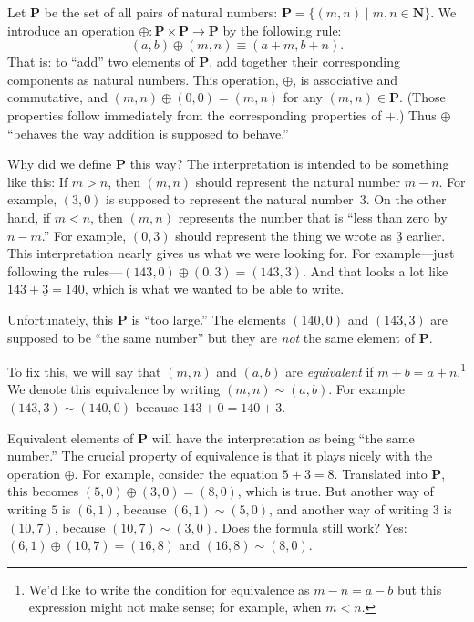 \documentclass[10pt, a4paper, twocolumn]{article}
\newcommand{\set}[1]{\mathbold{#1}}
\newcommand{\N}{\set{N}}
\newcommand{\pairs}{\set{P}}
\newcommand{\minus}[1]{\underline{#1}}
\begin{document}
Let $\pairs$ be the set of all pairs of natural numbers: $\pairs =
\{(m, n) \mid m,n\in \N\}$. We introduce an operation
$\oplus:\pairs\times\pairs\to\pairs$ by the following rule:
\begin{equation}\label{pairs:addition}
  (a, b) \oplus (m, n) \equiv (a + m, b + n).
\end{equation}
That is: to ``add'' two elements of $\pairs$, add together their
corresponding components as natural numbers. This operation, $\oplus$, is
associative and commutative, and $(m,n)\oplus(0,0) = (m,n)$ for any
$(m,n)\in\pairs$. (Those properties follow immediately from the
corresponding properties of $+$.) Thus $\oplus$ ``behaves the way addition
is supposed to behave.''

Why did we define $\pairs$ this way? The interpretation is intended to
be something like this: If $m>n$, then $(m,n)$ should represent the
natural number $m-n$. For example, $(3,0)$ is supposed to represent
the natural number~$3$. On the other hand, if $m<n$, then $(m,n)$
represents the number that is ``less than zero by $n-m$.'' For
example, $(0,3)$ should represent the thing we wrote as $\minus{3}$
earlier. This interpretation nearly gives us what we were looking
for. For example---just following the rules---$(143,0) \oplus (0,3) =
(143,3)$. And that looks a lot like $143+\minus{3}=140$, which is what
we wanted to be able to write.

Unfortunately, this $\pairs$ is ``too large.'' The elements $(140,0)$
and $(143,3)$ are supposed to be ``the same number'' but they are
\emph{not} the same element of $\pairs$.

To fix this, we will say that $(m,n)$ and $(a,b)$ are
\emph{equivalent} if $m + b = a + n$.\footnote{We'd like to
write the condition for equivalence as $m-n=a-b$ but this expression
might not make sense; for example, when $m<n$.} We denote this equivalence by
writing $(m,n) \sim (a,b)$. For example $(143,3)\sim(140,0)$ because
$143+0=140+3$. 

Equivalent elements of $\pairs$ will have the interpretation as being
``the same number.'' The crucial property of equivalence is that it
plays nicely with the operation $\oplus$. For example, consider the
equation $5+3=8$. Translated into $\pairs$, this becomes
$(5,0)\oplus(3,0)=(8,0)$, which is true. But another way of writing $5$ is
$(6,1)$, because $(6,1)\sim(5,0)$, and another way of writing $3$ is
$(10,7)$, because $(10,7)\sim(3,0)$. Does the formula still work? Yes:
$(6,1)\oplus(10,7)=(16,8)$ and $(16,8)\sim(8,0)$.
\end{document}
